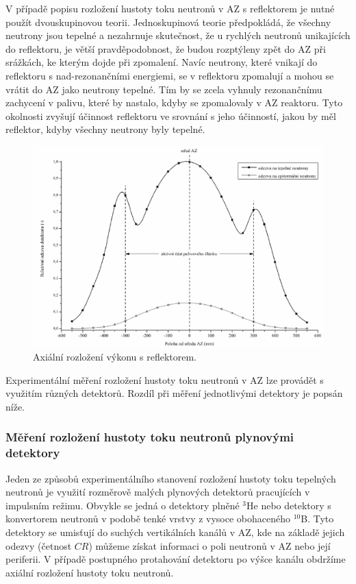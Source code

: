 V případě popisu rozložení hustoty toku neutronů v AZ s reflektorem je nutné použít dvouskupinovou teorii. Jednoskupinová teorie předpokládá, že všechny neutrony jsou tepelné a nezahrnuje skutečnost, že u rychlých neutronů unikajících do reflektoru, je větší pravděpodobnost, že budou rozptýleny zpět do AZ při srážkách, ke kterým dojde při zpomalení. Navíc neutrony, které vnikají do reflektoru s nad-rezonančními energiemi, se v reflektoru zpomalují a mohou se vrátit do AZ jako neutrony tepelné. Tím by se zcela vyhnuly rezonančnímu zachycení v palivu, které by nastalo, kdyby se zpomalovaly v AZ reaktoru. Tyto okolnosti zvyšují účinnost reflektoru ve srovnání s jeho účinností, jakou by měl reflektor, kdyby všechny neutrony byly tepelné.

\begin{figure}[H]
    \centering
    \includegraphics[scale=0.6]{img/AxiálníRozloženíVýkonu.png}
    \caption{Axiální rozložení výkonu s reflektorem.}
    \label{fig:AxiálníRozložníVýkonu}
\end{figure}

Experimentální měření rozložení hustoty toku neutronů v AZ lze provádět s využitím různých detektorů. Rozdíl při měření jednotlivými detektory je popsán níže.


\subsubsection{Měření rozložení hustoty toku neutronů plynovými detektory}

Jeden ze způsobů experimentálního stanovení rozložení hustoty toku tepelných neutronů je využití rozměrově malých plynových detektorů pracujících v impulsním režimu. Obvykle se jedná o detektory plněné $^3$He nebo detektory s konvertorem neutronů v podobě tenké vrstvy z vysoce obohaceného $^{10}$B. Tyto detektory se umisťují do suchých vertikálních kanálů v AZ, kde na základě jejich odezvy (četnost $CR$) můžeme získat informaci o poli neutronů v AZ nebo její periferii. V případě postupného protahování detektoru po výšce kanálu obdržíme axiální rozložení hustoty toku neutronů.

